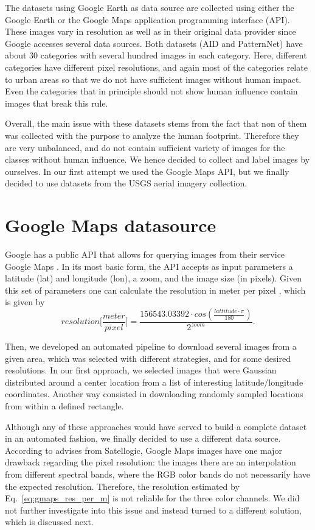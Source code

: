 The datasets using Google Earth as data source are collected using either the Google Earth or the Google Maps application programming interface (API). These images vary in resolution as well as in their original data provider since Google accesses several data sources. Both datasets (AID and PatternNet) have about 30 categories with several hundred images in each category. Here, different categories have different pixel resolutions, and again most of the categories relate to urban areas so that we do not have sufficient images without human impact. Even the categories that in principle should not show human influence contain images that break this rule.

Overall, the main issue with these datasets stems from the fact that non of them was collected with the purpose to analyze the human footprint. Therefore they are very unbalanced, and do not contain sufficient variety of images for the classes without human influence. We hence decided to collect and label images by ourselves. In our first attempt we used the Google Maps API, but we finally decided to use datasets from the USGS aerial imagery collection.

\section{Google Maps datasource}

Google has a public API that allows for querying images from their service Google Maps \parencite{google_maps_api}. In its most basic form, the API accepts as input parameters a latitude (lat) and longitude (lon), a zoom, and the image size (in pixels). Given this set of parameters one can calculate the resolution in meter per pixel \parencite{gmaps_res_per_m}, which is given by
\begin{equation}
resolution \Big[\frac{meter}{pixel}\Big] = \frac{156543.03392 \cdot cos(\frac{lattitude \cdot \pi}{180})}{2 ^ {zoom}}.
\label{eq:gmaps_res_per_m}
\end{equation}

Then, we developed an automated pipeline to download several images from a given area, which was selected with different strategies, and for some desired resolutions. In our first approach, we selected images that were Gaussian distributed around a center location from a list of interesting latitude/longitude coordinates. Another way consisted in downloading randomly sampled locations from within a defined rectangle.

Although any of these approaches would have served to build a complete dataset in an automated fashion, we finally decided to use a different data source. According to advises from Satellogic, Google Maps images have one major drawback regarding the pixel resolution: the images there are an interpolation from different spectral bands, where the RGB color bands do not necessarily have the expected resolution. Therefore, the resolution estimated by Eq.~\ref{eq:gmaps_res_per_m} is not reliable for the three color channels. We did not further investigate into this issue and instead turned to a different solution, which is discussed next.

